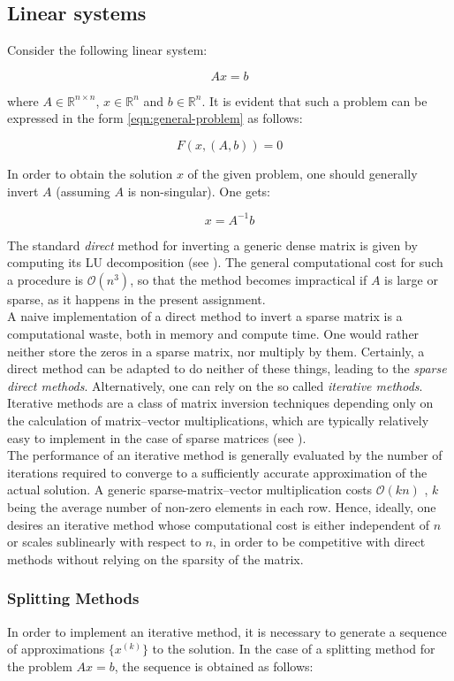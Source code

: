 \documentclass{article}
\theoremstyle{theorem}
\theoremstyle{definition}
\begin{document}
\subsection{Linear systems}
Consider the following linear system:

$$Ax=b$$

where $A\in\mathbb{R}^{n\times n}$, $x\in\mathbb{R}^n$ and $b\in\mathbb{R}^n$. It is evident that such a problem can be expressed in the form \eqref{eqn:general-problem} as follows:

$$F(x,(A,b))=0$$ 

In order to obtain the solution $x$ of the given problem, one should generally invert $A$ (assuming $A$ is non-singular). One gets:

$$x=A^{-1}b$$ 

The standard \emph{direct} method for inverting a generic dense matrix is given by computing its LU decomposition (see \cite{lec-notes}). The general computational cost for such a procedure is $\mathcal{O}(n^3)$, so that the method becomes impractical if $A$ is large or sparse, as it happens in the present assignment.\\
A naive implementation of a direct method to invert a sparse matrix is a computational waste, both in memory and compute time. One would rather neither store the zeros in a sparse matrix, nor multiply by them. Certainly, a direct method can be adapted to do neither of these things, leading to the \emph{sparse direct methods}. Alternatively, one can rely on the so called \emph{iterative methods}. Iterative methods are a class of matrix inversion techniques depending only on the calculation of matrix–vector multiplications, which are typically relatively easy to implement in the case of sparse matrices (see \cite{lec-notes}).\\
The performance of an iterative method is generally evaluated by the number of iterations required to converge to a sufficiently accurate approximation of the actual solution. A generic sparse-matrix–vector multiplication costs $\mathcal{O}(kn)$ , $k$ being the average number of non-zero elements in each row. Hence, ideally, one desires an iterative method whose computational cost is either independent of $n$ or scales sublinearly with respect to $n$, in order to be competitive with direct methods without relying on the sparsity of the matrix.\\

\subsubsection{Splitting Methods}
\label{subsubsec:splitting-methods}
In order to implement an iterative method, it is necessary to generate a sequence of approximations $\lbrace x^{(k)}\rbrace$ to the solution. In the case of a splitting method for the problem $Ax=b$, the sequence is obtained as follows:
\end{document}
